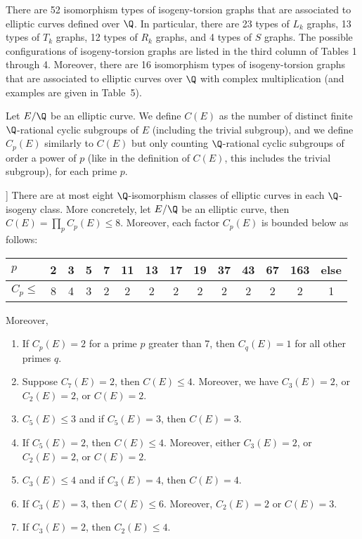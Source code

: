 \begin{thm} %
There are 52 isomorphism types of isogeny-torsion graphs that are associated to
elliptic curves defined over $\Q$. In particular, there are 23 types of $L_k$ graphs, 13 types of $T_k$ graphs, 12 types of $R_k$ graphs, and 4 types of $S$ graphs. The possible configurations of isogeny-torsion graphs are listed in the third column of Tables 1 through 4. Moreover, there are 16 isomorphism types of isogeny-torsion graphs that are associated to elliptic curves over $\Q$ with complex multiplication (and
examples are given in Table~5).
\end{thm}


\begin{dfn} %
Let $E/\Q$ be an elliptic curve. We define $C(E)$ as the number of distinct finite
$\Q$-rational cyclic subgroups of $E$ (including the trivial subgroup), and we define $C_p(E)$ similarly to $C(E)$ but only counting $\Q$-rational cyclic subgroups of order a power of $p$ (like in the definition of $C(E)$, this includes the trivial subgroup), for each prime $p$.
\end{dfn}


\begin{thm}[Kenku [7]] %
There are at most eight $\Q$-isomorphism classes of elliptic curves in each $\Q$-isogeny class. More concretely, let $E/\Q$ be an elliptic curve, then $C(E)= \prod_p C_p (E) \leq 8$. Moreover, each factor $C_p(E)$ is bounded below as follows:
	\begin{table}[!ht]
	\centering
	\begin{tabular}{l|c|c|c|c|c|c|c|c|c|c|c|c|c}
	$p$ & 2 & 3 & 5 & 7 & 11 & 13 & 17 & 19 & 37 & 43 & 67 & 163 & else \\ \hline
	$C_p \leq$ & 8 & 4 & 3 & 2 & 2 & 2 & 2 & 2 & 2 & 2 & 2 & 2 & 1
	\end{tabular}
	\end{table}
Moreover,
	\begin{enumerate}[(1)]
	\item If $C_p(E)= 2$ for a prime $p$ greater than 7, then $C_q(E)= 1$ for all other primes $q$.
	\item Suppose $C_7(E)= 2$, then $C(E) \leq 4$. Moreover, we have $C_3(E)= 2$, or $C_2(E)= 2$, or $C(E)= 2$.
	\item $C_5(E) \leq 3$ and if $C_5(E)= 3$, then $C(E)= 3$.
	\item If $C_5(E)= 2$, then $C(E) \leq 4$. Moreover, either $C_3(E)= 2$, or $C_2(E)= 2$, or $C(E)= 2$.
	\item $C_3(E) \leq 4$ and if $C_3(E)= 4$, then $C(E)= 4$. 
	\item If $C_3(E)= 3$, then $C(E) \leq 6$. Moreover, $C_2(E)= 2$ or $C(E)= 3$.
	\item If $C_3(E)= 2$, then $C_2(E) \leq 4$. 
	\end{enumerate}
\end{thm}



